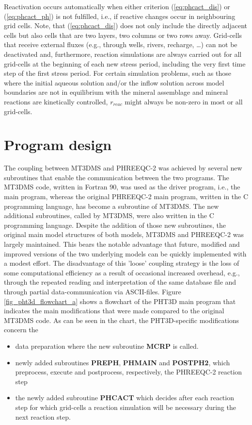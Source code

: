 Reactivation occurs automatically when either criterion
(\ref{eq:phcact_dis}) or (\ref{eq:phcact_ph}) is not fulfilled,
i.e., if reactive changes occur in neighbouring grid cells. Note,
that (\ref{eq:phcact_dis}) does not only include the directly
adjacent cells but also cells that are two layers, two columns or
two rows away. Grid-cells that receive external fluxes (e.g.,
through wells, rivers, recharge, \ldots{}) can not be deactivated and,
furthermore, reaction simulations are always carried out for all
grid-cells at the beginning of each new stress period, including
the very first time step of the first stress period. For certain
simulation problems, such as those where the initial aqueous
solution and/or the inflow solution across model boundaries are
not in equilibrium with the mineral assemblage and mineral
reactions are kinetically controlled, $r_{reac}$ might always be
non-zero in most or all grid-cells.

\section{Program design}
The coupling between MT3DMS and PHREEQC-2 was achieved by several
new subroutines that enable the communication between the two
programs. The MT3DMS code, written in Fortran 90, was used as the
driver program, i.e., the main program, whereas the original
PHREEQC-2 main program, written in the C programming language, has
become a subroutine of MT3DMS. The new additional subroutines,
called by MT3DMS, were also written in the C programming language.
Despite the addition of those new subroutines, the original main
model structures of both models, MT3DMS and PHREEQC-2 was largely
maintained. This bears the notable advantage that future, modified
and improved versions of the two underlying models can be quickly
implemented with a modest effort. The disadvantage of this 'loose'
coupling strategy is the loss of some computational efficiency as
a result of occasional increased overhead, e.g., through the
repeated reading and interpretation of the same database file and
through partial data-communication via ASCII-files. Figure
\ref{fig_pht3d_flowchart_a} shows a flowchart of the PHT3D main
program that indicates the main modifications that were made
compared to the original MT3DMS code. As can be seen in the chart,
the PHT3D-specific modifications concern the
\begin{itemize}
\item data preparation where the new subroutine \textbf{MCRP} is called.
\item newly added subroutines \textbf{PREPH}, \textbf{PHMAIN} and \textbf{POSTPH2}, which
preprocess, execute and postprocess, respectively, the PHREEQC-2 reaction step
\item the newly added subroutine \textbf{PHCACT} which decides after each reaction step
for which grid-cells a reaction simulation will be necessary during the next reaction step.
\end{itemize}

